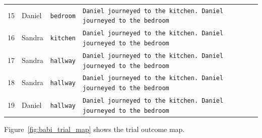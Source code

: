 \begin{table}[htbp]
\begin{tabular}{rlll}
    15 & Daniel & \texttt{bedroom} & \texttt{Daniel journeyed to the kitchen. Daniel journeyed to the bedroom} \\
    16 & Sandra & \texttt{kitchen} & \texttt{Daniel journeyed to the kitchen. Daniel journeyed to the bedroom} \\
    17 & Sandra & \texttt{hallway} & \texttt{Daniel journeyed to the kitchen. Daniel journeyed to the bedroom} \\
    18 & Sandra & \texttt{hallway} & \texttt{Daniel journeyed to the kitchen. Daniel journeyed to the bedroom} \\
    19 & Daniel & \texttt{hallway} & \texttt{Daniel journeyed to the kitchen. Daniel journeyed to the bedroom} \\
    \bottomrule
  \end{tabular}
\end{table}

Figure~\ref{fig:babi_trial_map} shows the trial outcome map.
